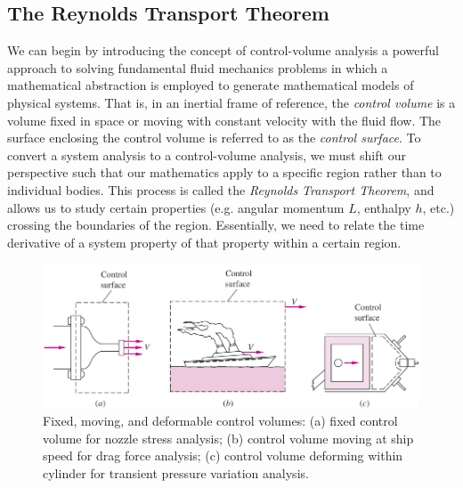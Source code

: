 \documentclass[10pt]{article} %
\numberwithin{equation}{section} %
\begin{document}
\begin{multicols}{2}
\begin{enumerate}
\end{enumerate}
\subsection{The Reynolds Transport Theorem}
We can begin by introducing the concept of control-volume analysis \textemdash{} a powerful approach to solving fundamental fluid mechanics problems \textemdash{} in which a mathematical abstraction is employed to generate mathematical models of physical systems. That is, in an inertial frame of reference, the \textit{control volume} is a volume fixed in space or moving with constant velocity with the fluid flow. The surface enclosing the control volume is referred to as the \textit{control surface}. To convert a system analysis to a control-volume analysis, we must shift our perspective such that our mathematics apply to a specific region rather than to individual bodies. This process is called the \textit{Reynolds Transport Theorem}, and allows us to study certain properties (e.g. angular momentum $L$, enthalpy $h$, etc.) crossing the boundaries of the region. Essentially, we need to relate the time derivative of a system property of that property within a certain region.
\end{multicols}
\begin{figure}[h] 
\centering
\includegraphics[scale=0.5]{control_types}
\caption{Fixed, moving, and deformable control volumes: (a) fixed control volume for nozzle stress analysis; (b) control volume moving at ship speed for drag force analysis; (c) control volume deforming within cylinder for transient pressure variation analysis.}
\label{fig:control-types} %
\end{figure}
\end{document}
